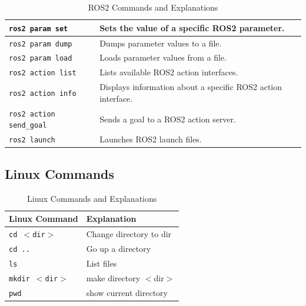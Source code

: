 \documentclass{article}
\begin{document}
\begin{table}[H]
\begin{tabular}{|p{6cm}|p{8cm}|}
        \texttt{ros2 param set} & Sets the value of a specific ROS2 parameter. \\
        \hline
        \texttt{ros2 param dump} & Dumps parameter values to a file. \\
        \hline
        \texttt{ros2 param load} & Loads parameter values from a file. \\
        \hline
        \texttt{ros2 action list} & Lists available ROS2 action interfaces. \\
        \hline
        \texttt{ros2 action info} & Displays information about a specific ROS2 action interface. \\
        \hline
        \texttt{ros2 action send\_goal} & Sends a goal to a ROS2 action server. \\
        \hline
        \texttt{ros2 launch} & Launches ROS2 launch files. \\
        \hline
    \end{tabular}
    \caption{ROS2 Commands and Explanations}
    \label{tab:ros2-commands}
\end{table}

\subsection{Linux Commands}

\begin{table}[H]
    \centering
    \begin{tabular}{|p{6cm}|p{8cm}|}
        \hline
        
        \textbf{Linux Command} & \textbf{Explanation} \\
        \hline
        
        \texttt{cd $<$dir$>$} & Change directory to dir \\
        \hline
        
        \texttt{cd ..} & Go up a directory \\
        \hline
        
        \texttt{ls} & List files \\
        \hline

        \texttt{mkdir $<$dir$>$} & make directory  $<$dir$>$\\
        \hline

        \texttt{pwd} & show current directory\\
        \hline
        
    \end{tabular}
    \caption{Linux Commands and Explanations}
    \label{tab:linux-commands}
\end{table}
\end{document}
